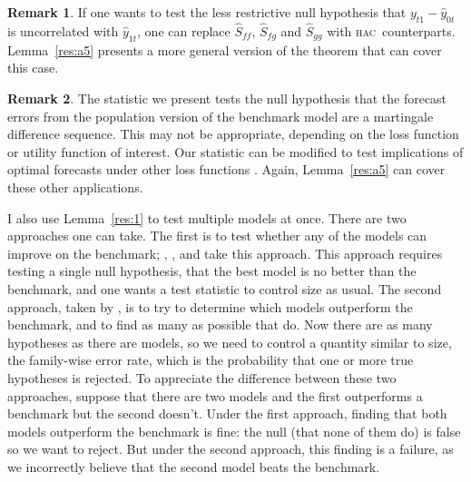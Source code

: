 \documentclass[12pt]{article}
\theoremstyle{definition}
\newtheorem{rem}{Remark}
\newcommand{\hac}{\textsc{hac}}
\begin{document}
\begin{rem}
  If one wants to test the less restrictive null hypothesis that
  $y_{t1} - \hat{y}_{0t}$ is uncorrelated with $\hat{y}_{1t}$, one can
  replace $\hat{S}_{ff}$, $\hat{S}_{fg}$ and $\hat{S}_{gg}$ with \hac\
  counterparts.  Lemma~\ref{res:a5} presents a more general version of
  the theorem that can cover this case.
\end{rem}

\begin{rem}
  The statistic we present tests the null hypothesis that the forecast
  errors from the population version of the benchmark model are a
  martingale difference sequence.  This may not be appropriate,
  depending on the loss function or utility function of interest.  Our
  statistic can be modified to test implications of optimal forecasts
  under other loss functions \citep[see][]{PaT:07,PaT:07b}.  Again,
  Lemma~\ref{res:a5} can cover these other applications.
\end{rem}


I also use Lemma~\ref{res:1} to test multiple models at once.  There
are two approaches one can take.  The first is to test whether any of
the models can improve on the benchmark; \citet{Whi:00},
\citet{Han:05}, and \citet{ClM:11} take this approach.  This approach
requires testing a single null hypothesis, that the best model is no
better than the benchmark, and one wants a test statistic to control
size as usual.  The second approach, taken by \citet{RoW:05}, is to
try to determine which models outperform the benchmark, and to find as
many as possible that do.  Now there are as many hypotheses as there
are models, so we need to control a quantity similar to size, the
family-wise error rate, which is the probability that one or more true
hypotheses is rejected.  To appreciate the difference between these
two approaches, suppose that there are two models and the first
outperforms a benchmark but the second doesn't.  Under the first
approach, finding that both models outperform the benchmark is fine:
the null (that none of them do) is false so we want to reject.  But
under the second approach, this finding is a failure, as we
incorrectly believe that the second model beats the benchmark.
\end{document}

